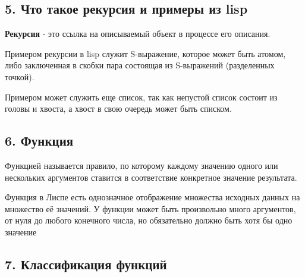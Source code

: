 

\subsection*{5. Что такое рекурсия и примеры из lisp}

\textbf{Рекурсия} - это ссылка на описываемый объект в процессе его описания.

Примером рекурсии в lisp служит S-выражение, которое может быть атомом,
либо заключенная в скобки пара состоящая из S-выражений (разделенных точкой).

Примером может служить еще список, так как непустой список состоит из головы и хвоста, а хвост в свою очередь может быть списком.

\subsection*{6. Функция}

Функцией называется правило, по которому каждому значению одного или нескольких аргументов ставится в соответствие конкретное значение результата.

Функция в Лиспе есть однозначное отображение множества исходных данных на множество её значений. У функции может быть произвольно много аргументов, от нуля до любого конечного числа, но обязательно должно быть хотя бы одно значение

\subsection*{7. Классификация функций}


